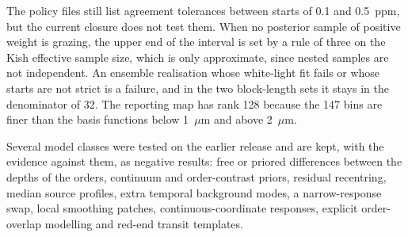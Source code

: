 The policy files still list agreement tolerances between starts of 0.1 and
0.5~ppm, but the current closure does not test them. When no posterior sample
of positive weight is grazing, the upper end of the interval is set by a rule
of three on the Kish effective sample size, which is only approximate, since
nested samples are not independent. An ensemble realisation whose white-light
fit fails or whose starts are not strict is a failure, and in the two
block-length sets it stays in the denominator of 32. The reporting map has
rank 128 because the 147 bins are finer than the basis functions below
1~$\mu\mathrm{m}$ and above 2~$\mu\mathrm{m}$.

Several model classes were tested on the earlier release and are kept, with
the evidence against them, as negative results: free or priored differences
between the depths of the orders, continuum and order-contrast priors,
residual recentring, median source profiles, extra temporal background
modes, a narrow-response swap, local smoothing patches,
continuous-coordinate responses, explicit order-overlap modelling
and red-end transit templates.

